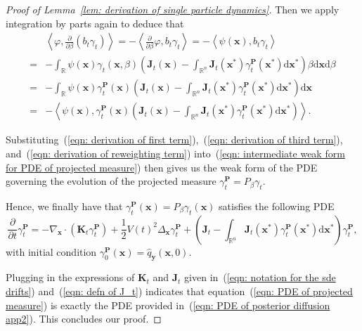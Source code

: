 \documentclass[10pt,a4paper]{amsart}
\newcommand{\dif}{{\mathrm{d}}}
\def\eqref#1{(\ref{#1})}
\def\mJ{{\bm{J}}}
\def\mK{{\bm{K}}}
\def\mP{{\bm{P}}}
\def\vx{{\bm{x}}}
\def\vy{{\bm{y}}}
\begin{document}
\begin{proof}[Proof of Lemma~\ref{lem: derivation of single particle dynamics}]
    Then we apply integration by parts again to deduce that
    \begin{equation}
    \label{eqn: derivation of reweighting term}
    \begin{aligned}
    &\left\langle \varphi, \frac{\partial}{\partial \beta}\left(b_t \gamma_t\right) \right\rangle = -\left\langle \frac{\partial}{\partial \beta}\varphi, b_t \gamma_t \right\rangle = -\left\langle \psi(\vx), b_t \gamma_t \right\rangle\\
    = &-\int_{\mathbb{R}}\psi(\vx)\gamma_t(\vx,\beta)\left(\mJ_t(\vx)-\int_{\mathbb{R}^n}\mJ_t(\vx^\ast)\gamma^{\mP}_t(\vx^\ast)\dif\vx^\ast\right)\beta\dif\vx\dif\beta\\
    = &-\int_{\mathbb{R}}\psi(\vx)\gamma^{\mP}_t(\vx)\left(\mJ_t(\vx)-\int_{\mathbb{R}^n}\mJ_t(\vx^\ast)\gamma^{\mP}_t(\vx^\ast)\dif\vx^\ast\right)\dif\vx\\
    = &-\left\langle\psi(\vx), \gamma^{\mP}_t(\vx)\left(\mJ_t(\vx)-\int_{\mathbb{R}^n}\mJ_t(\vx^\ast)\gamma^{\mP}_t(\vx^\ast)\dif\vx^\ast\right)\right\rangle.
    \end{aligned}    
    \end{equation}

    Substituting~\eqref{eqn: derivation of first term},~\eqref{eqn: derivation of third term}, and~\eqref{eqn: derivation of reweighting term} into~\eqref{eqn: intermediate weak form for PDE of projected measure} then gives us the weak form of the PDE governing the evolution of the projected measure $\gamma^{\mP}_t = P_{\beta}\gamma_t$. 
    
    Hence, we finally have that $\gamma^{\mP}_t(\vx) = P_{\beta}\gamma_t(\vx)$ satisfies the following PDE
    \begin{equation}
    \label{eqn: PDE of projected measure}
    \frac{\partial}{\partial t}\gamma^{\mP}_t = -\nabla_{\vx} \cdot \left(\mK_{t}\gamma^{\mP}_t\right) +\frac{1}{2}V(t)^2\Delta_{\vx}\gamma^{\mP}_t + \left(\mJ_t-\int_{\mathbb{R}^n}\mJ_t(\vx^\ast)\gamma^{\mP}_t(\vx^\ast)\dif\vx^\ast\right)\gamma^{\mP}_t,
    \end{equation}
    with initial condition $\gamma^{\mP}_0(\vx) =\widehat{q}_{\vy}(\vx,0)$. 
    
    Plugging in the expressions of $\mK_t$ and $\mJ_t$ given in~\eqref{eqn: notation for the sde drifts} and~\eqref{eqn: defn of J_t} indicates that equation~\eqref{eqn: PDE of projected measure} is exactly the PDE provided in~\eqref{eqn: PDE of posterior diffusion app2}. This concludes our proof.
\end{proof}
\end{document}
